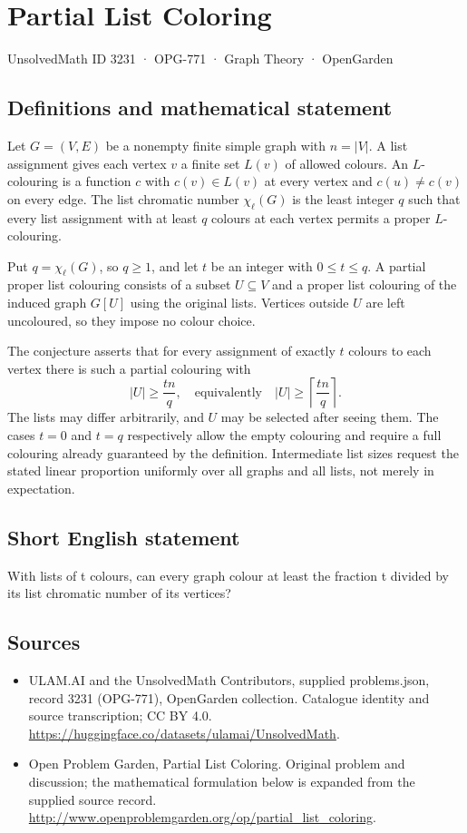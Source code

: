 \documentclass[11pt,a4paper]{article}
\begin{document}
\section*{Partial List Coloring}\label{3231}
{\small UnsolvedMath ID 3231 · OPG-771 · Graph Theory · OpenGarden}
\subsection{Definitions and mathematical statement}
Let $G=(V,E)$ be a nonempty
finite simple graph with
$n=|V|$. A list assignment
gives each vertex $v$ a
finite set $L(v)$ of allowed
colours. An $L$-colouring
is a function $c$ with
$c(v)\in L(v)$ at every
vertex and $c(u)\neq c(v)$
on every edge. The list
chromatic number $\chi_\ell(G)$
is the least integer $q$
such that every list assignment
with at least $q$ colours
at each vertex permits a
proper $L$-colouring.

Put $q=\chi_\ell(G)$, so
$q\geq1$, and let $t$
be an integer with
$0\leq t\leq q$. A partial
proper list colouring consists
of a subset $U\subseteq V$
and a proper list colouring
of the induced graph $G[U]$
using the original lists.
Vertices outside $U$ are
left uncoloured, so they
impose no colour choice.

The conjecture asserts that
for every assignment of
exactly $t$ colours to each
vertex there is such a
partial colouring with
\[
 |U|\geq\frac{tn}{q},
 \quad\text{equivalently}\quad
 |U|\geq\left\lceil\frac{tn}{q}\right\rceil.
\]
The lists may differ arbitrarily,
and $U$ may be selected
after seeing them. The cases
$t=0$ and $t=q$ respectively
allow the empty colouring
and require a full colouring
already guaranteed by the
definition. Intermediate list
sizes request the stated
linear proportion uniformly
over all graphs and all
lists, not merely in
expectation.
\subsection{Short English statement}
With lists of t colours, can every graph colour at least the fraction t divided by its list chromatic number of its vertices?
\subsection{Sources}
\begin{itemize}
\item[S1] ULAM.AI and the UnsolvedMath Contributors, supplied problems.json, record 3231 (OPG-771), OpenGarden collection. Catalogue identity and source transcription; CC BY 4.0.
\url{https://huggingface.co/datasets/ulamai/UnsolvedMath}.
\item[S2] Open Problem Garden, Partial List Coloring. Original problem and discussion; the mathematical formulation below is expanded from the supplied source record.
\url{http://www.openproblemgarden.org/op/partial_list_coloring}.
\end{itemize}
\end{document}
